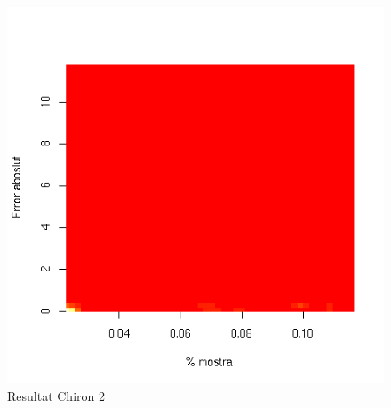 	\begin{figure}[tbp]
		\begin{center}
			\includegraphics[scale=0.75]{chiron/rgrau2.png}
		\end{center}
		\caption{Resultat Chiron 2}
		\label{fig:resChir2}
	\end{figure}

